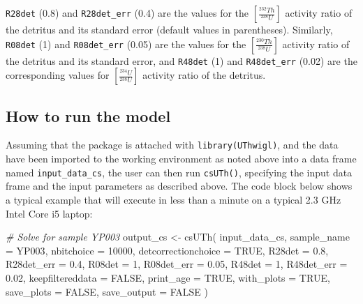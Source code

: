 \documentclass[]{elsarticle} %
\newenvironment{Shaded}{\begin{snugshade}}{\end{snugshade}}
\newcommand{\AttributeTok}[1]{\textcolor[rgb]{0.77,0.63,0.00}{#1}}
\newcommand{\CommentTok}[1]{\textcolor[rgb]{0.56,0.35,0.01}{\textit{#1}}}
\newcommand{\ConstantTok}[1]{\textcolor[rgb]{0.00,0.00,0.00}{#1}}
\newcommand{\DecValTok}[1]{\textcolor[rgb]{0.00,0.00,0.81}{#1}}
\newcommand{\FloatTok}[1]{\textcolor[rgb]{0.00,0.00,0.81}{#1}}
\newcommand{\FunctionTok}[1]{\textcolor[rgb]{0.00,0.00,0.00}{#1}}
\newcommand{\NormalTok}[1]{#1}
\newcommand{\OtherTok}[1]{\textcolor[rgb]{0.56,0.35,0.01}{#1}}
\newcommand{\StringTok}[1]{\textcolor[rgb]{0.31,0.60,0.02}{#1}}
\begin{document}
\texttt{R28det} (0.8) and \texttt{R28det\_err} (0.4) are the values for the \([\frac{^{232}Th}{^{238}U}]\) activity ratio of the detritus and its standard error (default values in parentheses). Similarly, \texttt{R08det} (1) and \texttt{R08det\_err} (0.05) are the values for the \([\frac{^{230}Th}{^{238}U}]\) activity ratio of the detritus and its standard error, and \texttt{R48det} (1) and \texttt{R48det\_err} (0.02) are the corresponding values for \([\frac{^{234}U}{^{238}U}]\) activity ratio of the detritus.

\hypertarget{how-to-run-the-model}{%
\subsection{How to run the model}\label{how-to-run-the-model}}

Assuming that the package is attached with \texttt{library(UThwigl)}, and the data have been imported to the working environment as noted above into a data frame named \texttt{input\_data\_cs}, the user can then run \texttt{csUTh()}, specifying the input data frame and the input parameters as described above. The code block below shows a typical example that will execute in less than a minute on a typical 2.3 GHz Intel Core i5 laptop:

\begin{Shaded}
\begin{Highlighting}[]
\CommentTok{\# Solve for sample YP003}
\NormalTok{output\_cs }\OtherTok{\textless{}{-}}
  \FunctionTok{csUTh}\NormalTok{(}
\NormalTok{    input\_data\_cs,}
    \AttributeTok{sample\_name =} \StringTok{\textquotesingle{}YP003\textquotesingle{}}\NormalTok{,}
    \AttributeTok{nbitchoice =} \DecValTok{10000}\NormalTok{,}
    \AttributeTok{detcorrectionchoice =} \ConstantTok{TRUE}\NormalTok{,}
    \AttributeTok{R28det =} \FloatTok{0.8}\NormalTok{,}
    \AttributeTok{R28det\_err =} \FloatTok{0.4}\NormalTok{,}
    \AttributeTok{R08det =} \DecValTok{1}\NormalTok{,}
    \AttributeTok{R08det\_err =} \FloatTok{0.05}\NormalTok{,}
    \AttributeTok{R48det =} \DecValTok{1}\NormalTok{,}
    \AttributeTok{R48det\_err =} \FloatTok{0.02}\NormalTok{,}
    \AttributeTok{keepfiltereddata =} \ConstantTok{FALSE}\NormalTok{,}
    \AttributeTok{print\_age =} \ConstantTok{TRUE}\NormalTok{,}
    \AttributeTok{with\_plots =} \ConstantTok{TRUE}\NormalTok{,}
    \AttributeTok{save\_plots =} \ConstantTok{FALSE}\NormalTok{,}
    \AttributeTok{save\_output =} \ConstantTok{FALSE}
\NormalTok{  )}
\end{Highlighting}
\end{Shaded}
\end{document}
